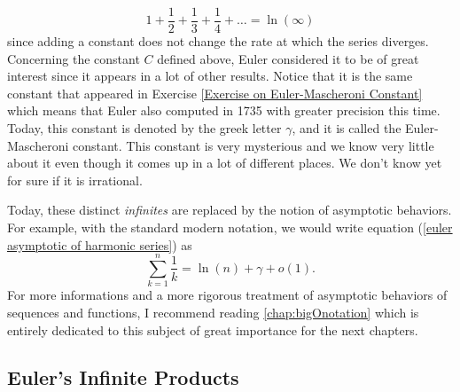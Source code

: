\begin{equation} \label{harmonic = ln(infinity)}
    1 + \frac{1}{2} + \frac{1}{3} + \frac{1}{4} + \dots = \ln(\infty)
\end{equation}
since adding a constant does not change the rate at which the series diverges. Concerning the constant $C$ defined above, Euler considered it to be of great interest since it appears in a lot of other results. Notice that it is the same constant that appeared in Exercise \ref{Exercise on Euler-Mascheroni Constant} which means that Euler also computed in 1735 with greater precision this time. Today, this constant is denoted by the greek letter $\gamma$, and it is called the Euler-Mascheroni constant. This constant is very mysterious and we know very little about it even though it comes up in a lot of different places. We don't know yet for sure if it is irrational.

Today, these distinct \textit{infinites} are replaced by the notion of asymptotic behaviors. For example, with the standard modern notation, we would write equation (\ref{euler asymptotic of harmonic series}) as
\begin{equation} \label{modern asymptotic of harmonic series}
    \sum_{k=1}^{n}\frac{1}{k} = \ln(n) + \gamma + o(1).
\end{equation}
For more informations and a more rigorous treatment of asymptotic behaviors of sequences and functions, I recommend reading \autoref{chap:bigOnotation} which is entirely dedicated to this subject of great importance for the next chapters.

\subsection*{Euler's Infinite Products}


